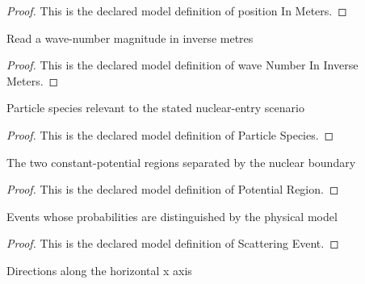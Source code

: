 \begin{proof}
  This is the declared model definition of position In Meters.
\end{proof}
\begin{definition}
  \label{def:physics:phyx-mini-0600:phyxminiproblems-problemphyxmini0600-wavenumberininversemeters}
  Read a wave-number magnitude in inverse metres
\end{definition}
\begin{proof}
  This is the declared model definition of wave Number In Inverse Meters.
\end{proof}
\begin{definition}
  \label{def:physics:phyx-mini-0600:phyxminiproblems-problemphyxmini0600-particlespecies}
  Particle species relevant to the stated nuclear-entry scenario
\end{definition}
\begin{proof}
  This is the declared model definition of Particle Species.
\end{proof}
\begin{definition}
  \label{def:physics:phyx-mini-0600:phyxminiproblems-problemphyxmini0600-potentialregion}
  The two constant-potential regions separated by the nuclear boundary
\end{definition}
\begin{proof}
  This is the declared model definition of Potential Region.
\end{proof}
\begin{definition}
  \label{def:physics:phyx-mini-0600:phyxminiproblems-problemphyxmini0600-scatteringevent}
  Events whose probabilities are distinguished by the physical model
\end{definition}
\begin{proof}
  This is the declared model definition of Scattering Event.
\end{proof}
\begin{definition}
  \label{def:physics:phyx-mini-0600:phyxminiproblems-problemphyxmini0600-horizontaldirection}
  Directions along the horizontal x axis
\end{definition}
